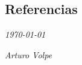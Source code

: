\documentclass[]{friggeri-cv}
\begin{document}
\begin{absolutelynopagebreak}
\section{Referencias}
\begin{entrylist}
\end{entrylist}
\end{absolutelynopagebreak}

\begin{flushleft}
    \emph{\today{}}
\end{flushleft}
\begin{flushright}
    \emph{Arturo Volpe}
\end{flushright}
\end{document}
